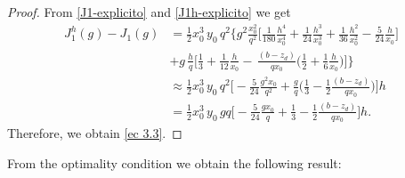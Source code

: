 \documentclass[11pt]{article}
\begin{document}
    
\begin{proof}
     From \eqref{J1-explicito} and \eqref{J1h-explicito} we get
   $$   \begin{array}{rl}
 {J^h_1}(g)-J_1(g)&= \frac{1}{2} x_0^3\, y_0 \,q^2 \Big\{g^2 \tfrac{x_0^2}{q^2} \Big[\frac{1}{180} \tfrac{h^4}{x_0^4}+\frac{1}{24}\tfrac{h^3}{x_0^3}+\frac{1}{36}\tfrac{h^2}{x_0^2}-\frac{5 }{24} \tfrac{h}{x_0}\Big] \\[0.45cm]
&    + g\,\tfrac{h}{q}  \Big[   \frac{1}{3} +  \frac{1}{12}\tfrac{h}{x_0} - \,\tfrac{(b-z_d)}{qx_0} \Big(  \frac{1}{2} + \tfrac{1}{6}\tfrac{h}{x_0} \Big) \Big] \Big\}\\[0.35cm]
&    \approx \frac{1}{2}x_0^3\, y_0\, q^2 \Big[-\frac{5}{24} \tfrac{g^2 x_0}{q^2}+\tfrac{g}{q}\Big(\tfrac{1}{3}-\tfrac{1}{2} \tfrac{(b-z_d)}{qx_0}\Big)\Big] h\\[0.45cm] 
&= \frac{1}{2}x_0^3\, y_0\,g q  \Big[-\frac{5}{24} \tfrac{g x_0}{q}+\tfrac{1}{3}-\tfrac{1}{2} \tfrac{(b-z_d)}{qx_0}\Big] h.
    \end{array}$$
    Therefore, we obtain \eqref{ec 3.3}.
\end{proof}    
   
   
  


    
     From the optimality condition we obtain the following result:
     
\end{document}

